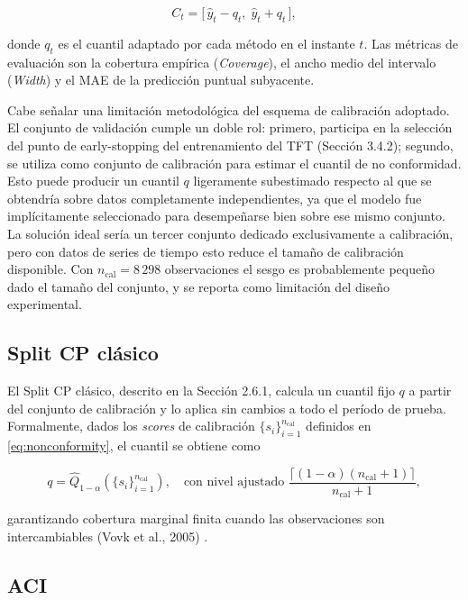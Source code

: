 \begin{equation}
    C_t = \bigl[\,\hat{y}_t - q_t,\; \hat{y}_t + q_t\,\bigr],
    \label{eq:interval}
\end{equation}

donde $q_t$ es el cuantil adaptado por cada método en el instante $t$. Las métricas de evaluación son la cobertura empírica (\textit{Coverage}), el ancho medio del intervalo (\textit{Width}) y el MAE de la predicción puntual subyacente.

Cabe señalar una limitación metodológica del esquema de calibración adoptado. El conjunto de validación cumple un doble rol: primero, participa en la selección del punto de early-stopping del entrenamiento del TFT (Sección 3.4.2); segundo, se utiliza como conjunto de calibración para estimar el cuantil de no conformidad. Esto puede producir un cuantil $q$ ligeramente subestimado respecto al que se obtendría sobre datos completamente independientes, ya que el modelo fue implícitamente seleccionado para desempeñarse bien sobre ese mismo conjunto. La solución ideal sería un tercer conjunto dedicado exclusivamente a calibración, pero con datos de series de tiempo esto reduce el tamaño de calibración disponible. Con $n_{\text{cal}} = 8\,298$ observaciones el sesgo es probablemente pequeño dado el tamaño del conjunto, y se reporta como limitación del diseño experimental.

\subsection{Split CP clásico}

El Split CP clásico, descrito en la Sección 2.6.1, calcula un cuantil fijo $q$ a partir del conjunto de calibración y lo aplica sin cambios a todo el período de prueba. Formalmente, dados los \textit{scores} de calibración $\{s_i\}_{i=1}^{n_{\text{cal}}}$ definidos en \eqref{eq:nonconformity}, el cuantil se obtiene como

\begin{equation}
    q = \hat{Q}_{1-\alpha}\!\left(\{s_i\}_{i=1}^{n_{\text{cal}}}\right),
    \quad
    \text{con nivel ajustado }
    \frac{\lceil (1-\alpha)(n_{\text{cal}}+1)\rceil}{n_{\text{cal}}+1},
    \label{eq:scp_quantile}
\end{equation}

garantizando cobertura marginal finita cuando las observaciones son intercambiables (Vovk et al., 2005) \cite{VovkCP}.

\subsection{ACI}
\label{sec:aci_metodologia}

